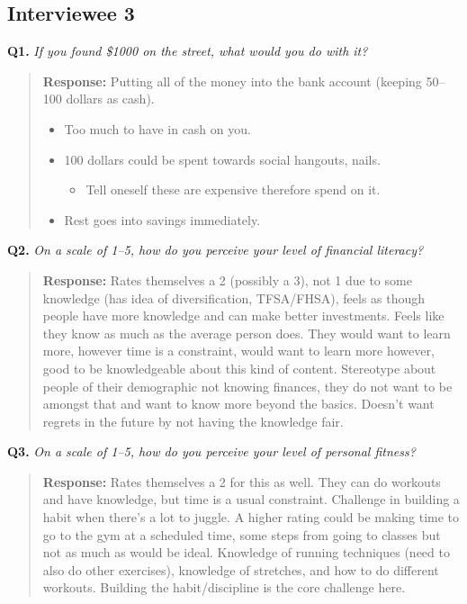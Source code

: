\documentclass[12pt]{article}
\begin{document}
\subsection{Interviewee 3}

\medskip
\noindent\textbf{Q1.} \textit{If you found \$1000 on the street, what would you do with it?}

\begin{quote}
\textbf{Response:} Putting all of the money into the bank account (keeping 50--100 dollars as cash).
\begin{itemize}
  \item Too much to have in cash on you.
  \item 100 dollars could be spent towards social hangouts, nails.
    \begin{itemize}
      \item Tell oneself these are expensive therefore spend on it.
    \end{itemize}
  \item Rest goes into savings immediately.
\end{itemize}
\end{quote}

\medskip
\noindent\textbf{Q2.} \textit{On a scale of 1--5, how do you perceive your level of financial literacy?}

\begin{quote}
\textbf{Response:} Rates themselves a 2 (possibly a 3), not 1 due to some knowledge (has idea of diversification, TFSA/FHSA), feels as though people have more knowledge and can make better investments. Feels like they know as much as the average person does. They would want to learn more, however time is a constraint, would want to learn more however, good to be knowledgeable about this kind of content. Stereotype about people of their demographic not knowing finances, they do not want to be amongst that and want to know more beyond the basics. Doesn't want regrets in the future by not having the knowledge fair.\par
\end{quote}

\medskip
\noindent\textbf{Q3.} \textit{On a scale of 1--5, how do you perceive your level of personal fitness?}

\begin{quote}
\textbf{Response:} Rates themselves a 2 for this as well. They can do workouts and have knowledge, but time is a usual constraint. Challenge in building a habit when there's a lot to juggle. A higher rating could be making time to go to the gym at a scheduled time, some steps from going to classes but not as much as would be ideal. Knowledge of running techniques (need to also do other exercises), knowledge of stretches, and how to do different workouts. Building the habit/discipline is the core challenge here.\par
\end{quote}
\end{document}

